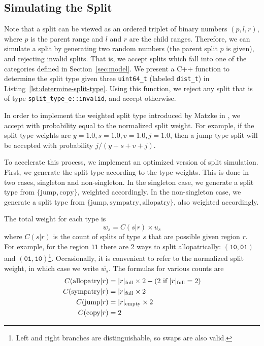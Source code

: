 \documentclass{article}
\begin{document}
\subsection{Simulating the Split}

Note that a split can be viewed as an ordered triplet of binary numbers \(
(p,l,r) \), where $p$ is the parent range and $l$ and $r$ are the child ranges.
Therefore, we can simulate a split by generating two random numbers (the parent
split $p$ is given), and rejecting invalid splits.
That is, we accept splits which fall into one of the categories defined in
Section~\ref{sec:model}.
We present a C++ function to determine the split type given three
\texttt{uint64_t} (labeled \texttt{dist_t}) in
Listing~\ref{lst:determine-split-type}.
Using this function, we reject any split that is of type
\texttt{split_type_e::invalid}, and accept otherwise.

In order to implement the weighted split type introduced by Matzke in
\cite{ModelSelectionMatzke2014}, we accept with probability equal to the
normalized split weight.
For example, if the split type weights are $y = 1.0, s = 1.0, v = 1.0, j=1.0$,
then a jump type split will be accepted with probability $j/(y + s + v +
j)$\footnotemark.

To accelerate this process, we implement an optimized version of split
simulation.
First, we generate the split type according to the type weights.
This is done in two cases, singleton and non-singleton.
In the singleton case, we generate a split type from $\{\text{jump},
\text{copy}\}$, weighted accordingly.
In the non-singleton case, we generate a split type from $\{\text{jump},
\text{sympatry}, \text{allopatry}\}$, also weighted accordingly.

The total weight for each type is
\begin{equation}
	w_s = C(s|r) \times u_s
\end{equation}
where $C(s|r)$ is the count of splits of type $s$ that are
possible given region $r$.
For example, for the region \texttt{11} there are 2 ways to split
allopatrically: $(\texttt{10}, \texttt{01})$ and $(\texttt{01},
\texttt{10})$\footnote{Left and right branches are distinguishable, so swaps
	are also valid.}\footnotemark.
Occasionally, it is convenient to refer to the normalized split weight, in
which case we write \( \overline{w_s} \).
The formulas for various counts are
\begin{align*}
  C(\text{allopatry}|r) & =
  |r|_\text{full} \times 2 - (2 \text{ if } |r|_\text{full} = 2) \\
  C(\text{sympatry}|r)  & = |r|_\text{full} \times 2           \\ C(\text{jump}|r) & =
  |r|_\text{empty} \times 2                                    \\ C(\text{copy}|r) & = 2 \\
\end{align*}
\end{document}
